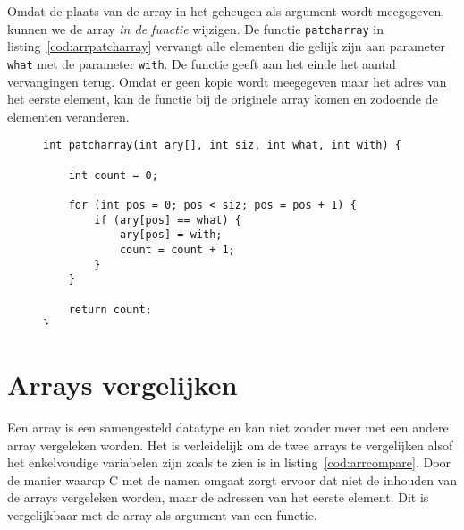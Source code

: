 Omdat de plaats van de array in het geheugen als argument wordt meegegeven, kunnen we de array \textsl{in de functie} wijzigen. De functie \texttt{patcharray} in listing~\ref{cod:arrpatcharray} vervangt alle elementen die gelijk zijn aan parameter \texttt{what} met de parameter \texttt{with}. De functie geeft aan het einde het aantal vervangingen terug. Omdat er geen kopie wordt meegegeven maar het adres van het eerste element, kan de functie bij de originele array komen en zodoende de elementen veranderen.

\begin{figure}[!ht]
\begin{lstlisting}[caption=Functie om een getal te vervangen door een ander getal.,label=cod:arrpatcharray]
int patcharray(int ary[], int siz, int what, int with) {

    int count = 0;

    for (int pos = 0; pos < siz; pos = pos + 1) {
        if (ary[pos] == what) {
            ary[pos] = with;
            count = count + 1;
        }
    }
    
    return count;
}
\end{lstlisting}
\end{figure}



\section{Arrays vergelijken}
Een array is een samengesteld datatype en kan niet zonder meer met een andere array vergeleken worden. Het is verleidelijk om de twee arrays te vergelijken alsof het enkelvoudige variabelen zijn zoals te zien is in listing~\ref{cod:arrcompare}. Door de manier waarop C met de namen omgaat zorgt ervoor dat niet de inhouden van de arrays vergeleken worden, maar de adressen van het eerste element. Dit is vergelijkbaar met de array als argument van een functie.

